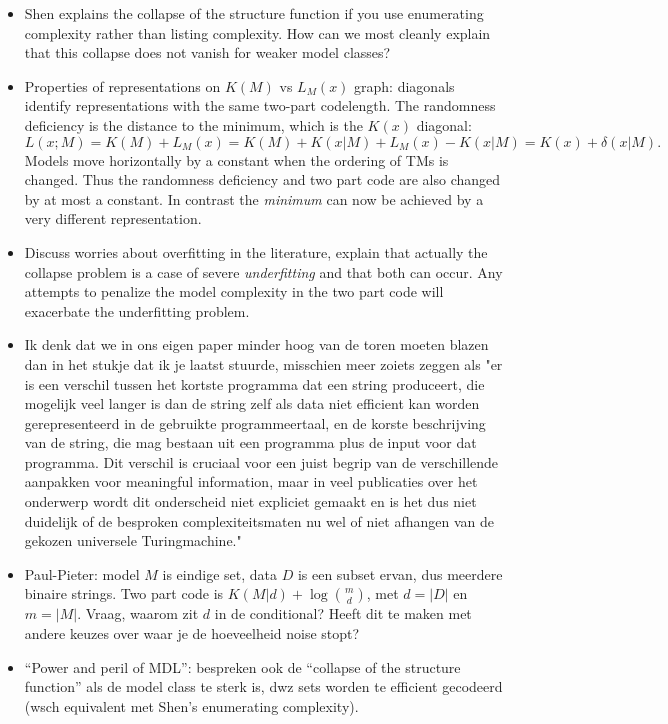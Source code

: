 \documentclass{article}
\begin{document}
\begin{itemize}
\item Shen explains the collapse of the structure function if you use enumerating complexity rather than listing complexity. How can we most cleanly explain that this collapse does not vanish for weaker model classes?

\item Properties of representations on $K(M)$ vs $L_M(x)$ graph: diagonals identify representations with the same two-part codelength. The randomness deficiency is the distance to the minimum, which is the $K(x)$ diagonal:
\[L(x;M)=K(M)+L_M(x) =K(M)+K(x|M)+L_M(x)-K(x|M)  = K(x)+\delta(x|M).\]
 Models move horizontally by a constant when the ordering of TMs is changed. Thus the randomness deficiency and two part code are also changed by at most a constant. In contrast the \emph{minimum} can now be achieved by a very different representation.

\item Discuss worries about overfitting in the literature, explain that actually the collapse problem is a case of severe \emph{underfitting} and that both can occur. Any attempts to penalize the model complexity in the two part code will exacerbate the underfitting problem.

\item Ik denk dat we in ons eigen paper minder hoog van de toren moeten blazen dan in het stukje dat ik je laatst stuurde, misschien meer zoiets zeggen als "er is een verschil tussen het kortste programma dat een string produceert, die mogelijk veel langer is dan de string zelf als data niet efficient kan worden gerepresenteerd in de gebruikte programmeertaal, en de korste beschrijving van de string, die mag bestaan uit een programma plus de input voor dat programma. Dit verschil is cruciaal voor een juist begrip van de verschillende aanpakken voor meaningful information, maar in veel publicaties over het onderwerp wordt dit onderscheid niet expliciet gemaakt en is het dus niet duidelijk of de besproken complexiteitsmaten nu wel of niet afhangen van de gekozen universele Turingmachine."

\item Paul-Pieter: model $M$ is eindige set, data $D$ is een subset ervan, dus meerdere binaire strings. Two part code is $K(M|d)+\log\binom{m}{d}$, met $d=|D|$ en $m=|M|$. Vraag, waarom zit $d$ in de conditional? Heeft dit te maken met andere keuzes over waar je de hoeveelheid noise stopt?

\item ``Power and peril of MDL'': bespreken ook de ``collapse of the structure function'' als de model class te sterk is, dwz sets worden te efficient gecodeerd (wsch equivalent met Shen's enumerating complexity).


\end{itemize}
\end{document}

